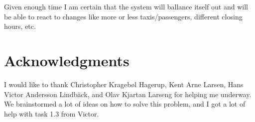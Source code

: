 \documentclass[conference]{IEEEtran}
\begin{document}
Given enough time I am certain that the system will ballance itself out and will be able to react to changes like more or less taxis/passengers, different closing hours, etc.

\section*{Acknowledgments}
I would like to thank Christopher Kragebøl Hagerup, Kent Arne Larsen, Hans Victor Andersson Lindbäck, and Olav Kjartan Larseng for helping me underway. We brainstormed a lot of ideas on how to solve this problem, and I got a lot of help with task 1.3 from Victor.
\end{document}
